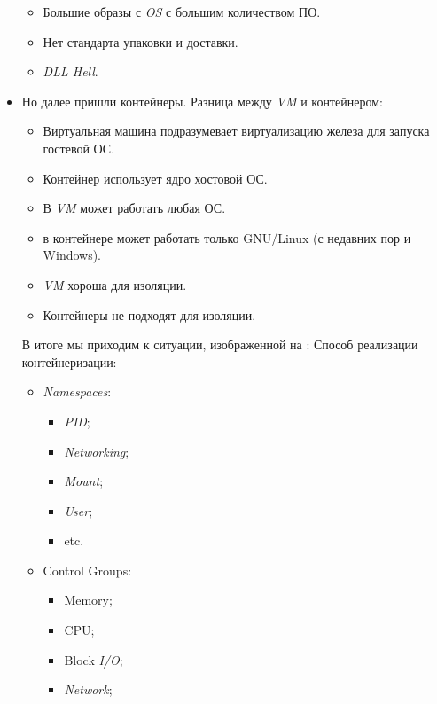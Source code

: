 \begin{itemize}
\begin{itemize}
            \item Большие образы с \textit{OS} с большим количеством ПО.
            \item Нет стандарта упаковки и доставки.
            \item \textit{DLL Hell}.
        \end{itemize}
    \item Но далее пришли контейнеры. Разница между \textit{VM} и контейнером:
        \begin{itemize}
            \item Виртуальная машина подразумевает виртуализацию железа для запуска гостевой ОС.
            \item Контейнер использует ядро хостовой ОС.
            \item В \textit{VM} может работать любая ОС.
            \item в контейнере может работать только GNU/Linux (с недавних пор и Windows).
            \item \textit{VM} хороша для изоляции.
            \item Контейнеры не подходят для изоляции.
        \end{itemize}
        В итоге мы приходим к ситуации, изображенной на :
        \newpage
        Способ реализации контейнеризации:
        \begin{itemize}
            \item \textit{Namespaces}:
                \begin{itemize}
                    \item \textit{PID};
                    \item \textit{Networking};
                    \item \textit{Mount};
                    \item \textit{User};
                    \item etc.
                \end{itemize}
            \item Control Groups:
                \begin{itemize}
                    \item Memory;
                    \item CPU;
                    \item Block \textit{I/O};
                    \item \textit{Network};

\end{itemize}
\end{itemize}
\end{itemize}
